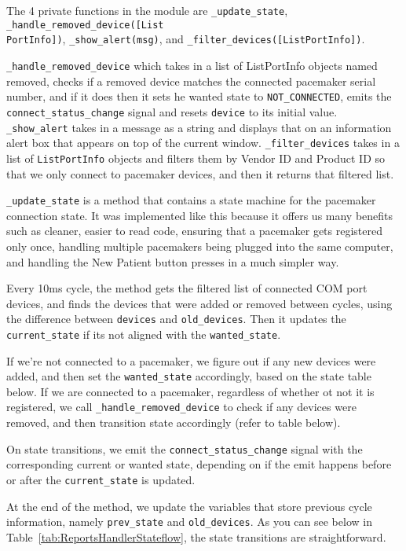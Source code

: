 \documentclass[12pt]{article}
\begin{document}
The 4 private functions in the module are \verb|_update_state|, \verb|_handle_removed_device([List|\\\verb|PortInfo])|, \verb|_show_alert(msg)|, and \verb|_filter_devices([ListPortInfo])|. 

\verb|_handle_removed_device| which takes in a list of ListPortInfo objects named removed, checks if a removed device matches the connected pacemaker serial number, and if it does then it sets he wanted state to \verb|NOT_CONNECTED|, emits the \verb|connect_status_change| signal and resets \verb|device| to its initial value. \verb|_show_alert| takes in a message as a string and displays that on an information alert box that appears on top of the current window. \verb|_filter_devices| takes in a list of \verb|ListPortInfo| objects and filters them by Vendor ID and Product ID so that we only connect to pacemaker devices, and then it returns that filtered list.

\verb|_update_state| is a method that contains a state machine for the pacemaker connection state.
It was implemented like this because it offers us many benefits such as cleaner, easier to read code, ensuring that a pacemaker gets registered only once, handling multiple pacemakers being plugged into the same computer, and handling the New Patient button presses in a much simpler way.

Every 10ms cycle, the method gets the filtered list of connected COM port devices, and finds the devices that were added or removed between cycles, using the difference between \verb|devices| and \verb|old_devices|.
Then it updates the \verb|current_state| if its not aligned with the \verb|wanted_state|.

If we're not connected to a pacemaker, we figure out if any new devices were added, and then set the \verb|wanted_state| accordingly, based on the state table below.
If we are connected to a pacemaker, regardless of whether ot not it is registered, we call \verb|_handle_removed_device| to check if any devices were removed, and then transition state accordingly (refer to table below).

On state transitions, we emit the \verb|connect_status_change| signal with the corresponding current or wanted state, depending on if the emit happens before or after the \verb|current_state| is updated.

At the end of the method, we update the variables that store previous cycle information, namely \verb|prev_state| and \verb|old_devices|.
As you can see below in Table~\ref{tab:ReportsHandlerStateflow}, the state transitions are straightforward.
\end{document}
